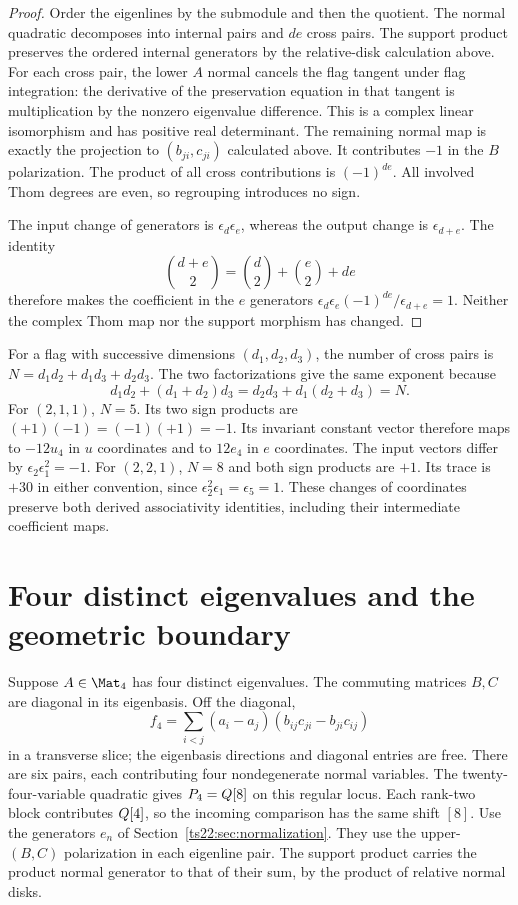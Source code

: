 \begin{proof}
Order the eigenlines by the submodule and then the quotient.
The normal quadratic decomposes into internal pairs and $de$ cross pairs.
The support product preserves the ordered internal generators by the
relative-disk calculation above. For each cross pair, the lower $A$
normal cancels the flag tangent under flag integration: the derivative
of the preservation equation in that tangent is multiplication by the
nonzero eigenvalue difference. This is a complex linear isomorphism
and has positive real determinant. The remaining normal map is exactly
the projection to $(b_{ji},c_{ji})$ calculated above.
It contributes $-1$ in the $B$ polarization.
The product of all cross contributions is $(-1)^{de}$.
All involved Thom degrees are even, so regrouping introduces no sign.

The input change of generators is $\epsilon_d\epsilon_e$, whereas
the output change is $\epsilon_{d+e}$. The identity
\[
 \binom{d+e}{2}=\binom d2+\binom e2+de
\]
therefore makes the coefficient in the $e$ generators
$\epsilon_d\epsilon_e(-1)^{de}/\epsilon_{d+e}=1$.
Neither the complex Thom map nor the support morphism has changed.
\end{proof}

For a flag with successive dimensions $(d_1,d_2,d_3)$, the number
of cross pairs is $N=d_1d_2+d_1d_3+d_2d_3$.
The two factorizations give the same exponent because
\[
 d_1d_2+(d_1+d_2)d_3=d_2d_3+d_1(d_2+d_3)=N.
\]
For $(2,1,1)$, $N=5$. Its two sign products are
$(+1)(-1)=(-1)(+1)=-1$. Its invariant constant vector therefore
maps to $-12u_4$ in $u$ coordinates and to $12e_4$ in $e$ coordinates.
The input vectors differ by $\epsilon_2\epsilon_1^2=-1$.
For $(2,2,1)$, $N=8$ and both sign products are $+1$.
Its trace is $+30$ in either convention, since
$\epsilon_2^2\epsilon_1=\epsilon_5=1$.
These changes of coordinates preserve both derived associativity
identities, including their intermediate coefficient maps.

\section{Four distinct eigenvalues and the geometric boundary}
\label{ts22:sec:regular}

Suppose $A\in\Mat_4$ has four distinct eigenvalues. The commuting
matrices $B,C$ are diagonal in its eigenbasis. Off the diagonal,
\[
 f_4=\sum_{i<j}(a_i-a_j)
                 (b_{ij}c_{ji}-b_{ji}c_{ij})
\]
in a transverse slice; the eigenbasis directions and diagonal entries
are free. There are six pairs, each contributing four nondegenerate
normal variables. The twenty-four-variable quadratic gives
$P_4=Q[8]$ on this regular locus. Each rank-two block contributes
$Q[4]$, so the incoming comparison has the same shift $[8]$.
Use the generators $e_n$ of Section~\ref{ts22:sec:normalization}.
They use the upper-$(B,C)$ polarization in each eigenline pair.
The support product carries the product normal generator to that
of their sum, by the product of relative normal disks.

